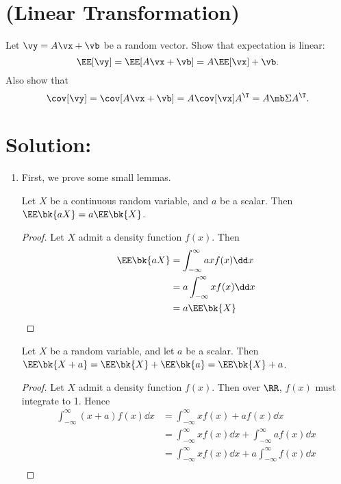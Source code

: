 \documentclass[189]{pset}
\begin{document}

  \section{(Linear Transformation)}
    Let $\vy = A \vx + \vb$ be a random vector. Show that
    expectation is linear:
    \[
      \EE[\vy] = \EE[A\vx + \vb] = A\EE[\vx] + \vb.
    \]
    Also show that
    \[
      \cov[\vy] = \cov[A\vx + \vb] = A \cov[\vx] A^\T = A\mb\Sigma A^\T.
    \]

  \hrulefill

  \section*{Solution:}
    \begin{enumerate}
      \item First, we prove some small lemmas.
        \begin{lemma}
          Let $X$ be a continuous random variable, and $a$ be a
          scalar. Then $\EE\bk{aX}=a\EE\bk{X}$.
        \end{lemma}
        \begin{proof}
          Let $X$ admit a density function $f(x)$. Then
          \begin{align*}
            \EE\bk{aX}
            &= \int_{-\infty}^\infty axf(x) \dd x \\
            &= a\int_{-\infty}^\infty xf(x) \dd x \\
            &= a\EE\bk{X}
          \end{align*}
        \end{proof}
        \begin{lemma}
          Let $X$ be a random variable, and let $a$ be a scalar. Then
          $\EE\bk{X+a}=\EE\bk{X}+\EE\bk{a}=\EE\bk{X}+a$.
        \end{lemma}
        \begin{proof}
          Let $X$ admit a density function $f(x)$. Then over $\RR$,
          $f(x)$ must integrate to 1. Hence
          \begin{align*}
            \int_{-\infty}^\infty (x+a)f(x) \dd x
            &= \int_{-\infty}^\infty xf(x) + af(x) \dd x \\
            &= \int_{-\infty}^\infty xf(x) \dd x +
              \int_{-\infty}^\infty af(x) \dd x \\
            &= \int_{-\infty}^\infty xf(x) \dd x +
              a\int_{-\infty}^\infty f(x) \dd x \\

\end{align*}
\end{proof}
\end{enumerate}
\end{document}
